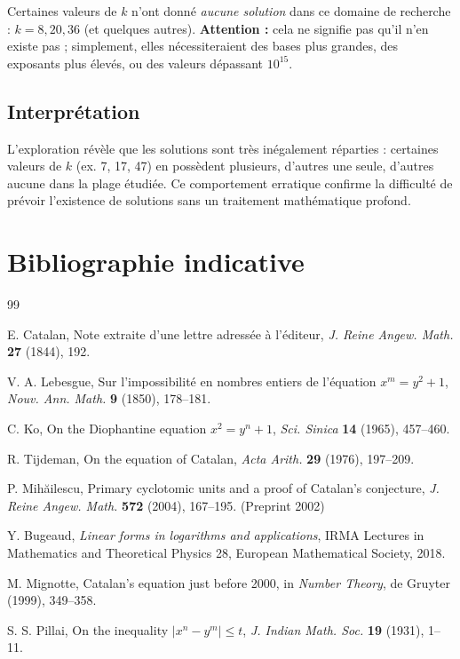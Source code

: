 \documentclass[12pt,a4paper]{article}
\theoremstyle{plain}
\theoremstyle{definition}
\begin{document}
Certaines valeurs de $k$ n'ont donné \emph{aucune solution} dans ce domaine de recherche : $k = 8, 20, 36$ (et quelques autres). \textbf{Attention :} cela ne signifie pas qu'il n'en existe pas ; simplement, elles nécessiteraient des bases plus grandes, des exposants plus élevés, ou des valeurs dépassant $10^{15}$.

\subsection{Interprétation}

L'exploration révèle que les solutions sont très inégalement réparties : certaines valeurs de $k$ (ex. 7, 17, 47) en possèdent plusieurs, d'autres une seule, d'autres aucune dans la plage étudiée. Ce comportement erratique confirme la difficulté de prévoir l'existence de solutions sans un traitement mathématique profond.

\section{Bibliographie indicative}
\label{sec:biblio}

\begin{thebibliography}{99}

E. Catalan, Note extraite d'une lettre adressée à l'éditeur, \emph{J. Reine Angew. Math.} \textbf{27} (1844), 192.

V. A. Lebesgue, Sur l'impossibilité en nombres entiers de l'équation $x^m = y^2 + 1$, \emph{Nouv. Ann. Math.} \textbf{9} (1850), 178--181.

C. Ko, On the Diophantine equation $x^2 = y^n + 1$, \emph{Sci. Sinica} \textbf{14} (1965), 457--460.

R. Tijdeman, On the equation of Catalan, \emph{Acta Arith.} \textbf{29} (1976), 197--209.

P. Mihăilescu, Primary cyclotomic units and a proof of Catalan's conjecture, \emph{J. Reine Angew. Math.} \textbf{572} (2004), 167--195. (Preprint 2002)

Y. Bugeaud, \emph{Linear forms in logarithms and applications}, IRMA Lectures in Mathematics and Theoretical Physics 28, European Mathematical Society, 2018.

M. Mignotte, Catalan's equation just before 2000, in \emph{Number Theory}, de Gruyter (1999), 349--358.

S. S. Pillai, On the inequality $|x^n - y^m| \le t$, \emph{J. Indian Math. Soc.} \textbf{19} (1931), 1--11.

\end{thebibliography}
\end{document}

